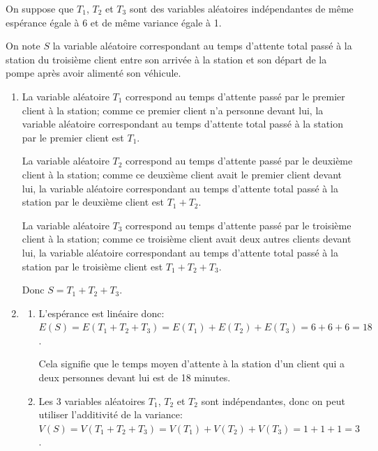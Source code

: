 On suppose que $T_1$, $T_2$ et $T_3$ sont des variables aléatoires indépendantes de même espérance égale à $6$ et de même variance égale à 1.

On note $S$ la variable aléatoire correspondant au temps d'attente total passé à la station du troisième client entre son arrivée à la station et son départ de la pompe après avoir alimenté son véhicule.

\medskip

\begin{enumerate}
\item%
La variable aléatoire $T_1$ correspond au temps d'attente passé par le premier client à la station; comme ce premier client n'a personne devant lui, la variable aléatoire correspondant au temps d'attente total passé à la station par le premier client est $T_1$.

La variable aléatoire $T_2$ correspond au temps d'attente passé par le deuxième client à la station; comme ce deuxième client avait le premier client devant lui, la variable aléatoire correspondant au temps d'attente total passé à la station par le deuxième client est $T_1+T_2$.

La variable aléatoire $T_3$ correspond au temps d'attente passé par le troisième client à la station; comme ce troisième client avait deux autres clients devant lui, la variable aléatoire correspondant au temps d'attente total passé à la station par le troisième client est $T_1+T_2+T_3$.

Donc $S=T_1+T_2+T_3$.

\item 
	\begin{enumerate}
		\item %
L'espérance est linéaire donc:\\
$E(S)=E\left (T_1+T_2+T_3\right ) = E\left (T_1\right )+ E\left (T_2\right )+ E\left (T_3\right ) =6+6+6=18$.

Cela signifie que le temps moyen d'attente à la station d'un client qui a deux personnes devant lui est de 18 minutes.
		
		\item %
Les 3 variables aléatoires $T_1$, $T_2$ et $T_2$ sont indépendantes, donc on peut utiliser l'additivité de la variance:\\
$V(S)=V\left (T_1+T_2+T_3\right ) = V\left (T_1\right )+ V\left (T_2\right )+ V\left (T_3\right ) =1+1+1=3$.
	\end{enumerate}
	

\end{enumerate}
